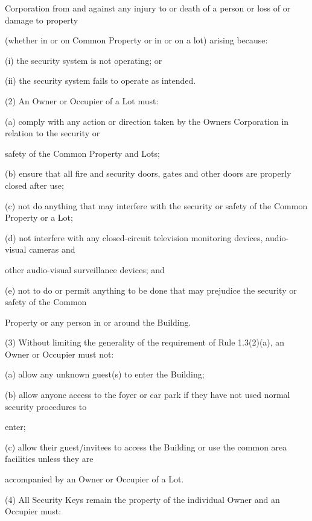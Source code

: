 \documentclass{article}
\begin{document}
{\fontsize{10.02}{1}Corporation from and against any injury to or death of a person or loss of or damage to property }

{\fontsize{10.02}{1}(whether in or on Common Property or in or on a lot) arising because: }

{\fontsize{9.962}{1}(i) the security system is not operating; or }

{\fontsize{9.962}{1}(ii) the security system fails to operate as intended. }

{\fontsize{9.962}{1}(2) An Owner or Occupier of a Lot must: }

{\fontsize{9.962}{1}(a) comply with any action or direction taken by the Owners Corporation in relation to the security or }

{\fontsize{10.02}{1}safety of the Common Property and Lots; }

{\fontsize{9.962}{1}(b) ensure that all fire and security doors, gates and other doors are properly closed after use; }

{\fontsize{9.962}{1}(c) not do anything that may interfere with the security or safety of the Common Property or a Lot; }

{\fontsize{9.962}{1}(d) not interfere with any closed-circuit television monitoring devices, audio-visual cameras and }

{\fontsize{10.02}{1}other audio-visual surveillance devices; and }

{\fontsize{9.962}{1}(e) not to do or permit anything to be done that may prejudice the security or safety of the Common }

{\fontsize{10.02}{1}Property or any person in or around the Building. }

{\fontsize{9.962}{1}(3) Without limiting the generality of the requirement of Rule 1.3(2)(a), an Owner or Occupier must not: }

{\fontsize{9.962}{1}(a) allow any unknown guest(s) to enter the Building; }

{\fontsize{9.962}{1}(b) allow anyone access to the foyer or car park if they have not used normal security procedures to }

{\fontsize{10.02}{1}enter; }

{\fontsize{9.962}{1}(c) allow their guest/invitees to access the Building or use the common area facilities unless they are }

{\fontsize{10.02}{1}accompanied by an Owner or Occupier of a Lot. }

{\fontsize{9.962}{1}(4) All Security Keys remain the property of the individual Owner and an Occupier must: }
\end{document}
